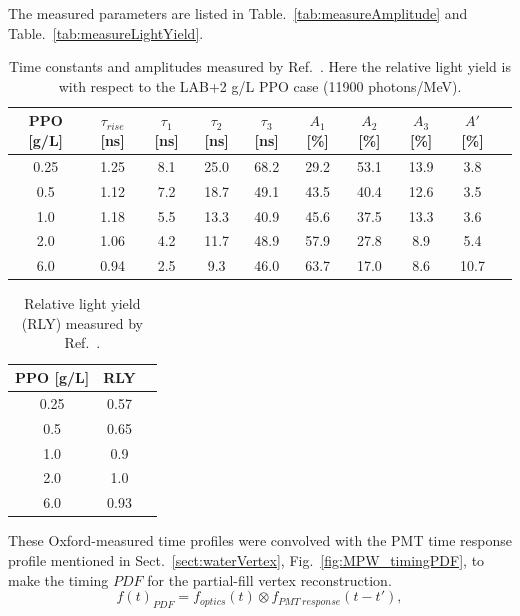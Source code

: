 The measured parameters are listed in Table.~\ref{tab:measureAmplitude} and Table.~\ref{tab:measureLightYield}.
\begin{table}[ht]
	\centering\label{tab:measureAmplitude}
	\caption{\label{oxfordMeasure} Time constants and amplitudes measured by Ref.~\cite{oxfordMeasurement}. Here the relative light yield is with respect to the LAB+2 g/L PPO case (11900 photons/MeV).}	
	{\centering
		\begin{tabular*}{160mm}{c@{\extracolsep{\fill}}ccccccccc}
			\toprule 
			PPO [g/L] & $\tau_{rise}$ [ns] & $\tau_1$ [ns] & $\tau_2$ [ns] & $\tau_3$ [ns] & $A_1$ [\%]  & $A_2$ [\%]   & $A_3$ [\%]  & $A'$ [\%] \\
			\midrule
			0.25 & 1.25 & 8.1 & 25.0 & 68.2 & 29.2 & 53.1 & 13.9 & 3.8\\
			0.5  & 1.12 & 7.2 & 18.7 & 49.1 & 43.5 & 40.4 & 12.6 & 3.5 \\
			1.0 & 1.18 & 5.5 & 13.3 & 40.9 & 45.6 & 37.5 & 13.3 & 3.6 \\
			2.0 & 1.06 & 4.2 & 11.7 & 48.9 & 57.9 & 27.8 & 8.9 & 5.4	\\
			6.0 & 0.94 & 2.5 & 9.3  & 46.0 & 63.7 & 17.0 & 8.6 & 10.7\\
			\bottomrule	
		\end{tabular*}
	}
\end{table}
\begin{table}[ht]
	\centering\label{tab:measureLightYield}
	\caption{\label{oxfordMeasure2}Relative light yield (RLY) measured by Ref.~\cite{oxfordMeasurement}.}	
	{\centering
		\begin{tabular*}{60mm}{c@{\extracolsep{\fill}}cc}
			\toprule 
			PPO [g/L] & RLY \\
			\midrule
			0.25 & 0.57\\
			0.5 & 0.65\\
			1.0 & 0.9\\
			2.0 & 1.0\\
			6.0 & 0.93\\
			\bottomrule	
		\end{tabular*}
	}
\end{table}

These Oxford-measured time profiles were convolved with the PMT time response profile mentioned in Sect.~\ref{sect:waterVertex}, Fig.~\ref{fig:MPW_timingPDF}, to make the timing $PDF$ for the partial-fill vertex reconstruction. 
\begin{equation}\label{eq:OxfordTimingPDF}
f(t)_{PDF} = f_{optics}(t)\otimes f_{PMT~response}(t-t'),
\end{equation}

